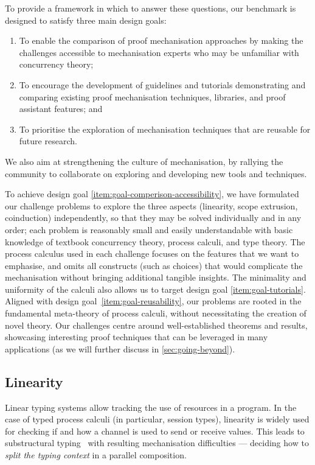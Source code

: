 \documentclass[runningheads]{llncs}
\begin{document}
To provide a framework in which to answer these questions, our benchmark is designed to satisfy three main design goals:
\begin{enumerate}[label=\textbf{(G\arabic*)},leftmargin=10mm]
\item\label{item:goal-comperison-accessibility} To enable the comparison of
  proof mechanisation approaches by making the challenges accessible to
  mechanisation experts who may be unfamiliar with concurrency theory;

\item\label{item:goal-tutorials} To encourage the development of guidelines and
  tutorials demonstrating and comparing existing proof mechanisation
  techniques, libraries, and proof assistant features; and

\item\label{item:goal-reusability} To prioritise the exploration of mechanisation
  techniques that are reusable for future research.
\end{enumerate}
We also aim at strengthening the culture of mechanisation, by rallying the community to collaborate on exploring and developing new tools and techniques.

To achieve design goal \ref{item:goal-comperison-accessibility}, we have
formulated our challenge problems to explore the three aspects
(linearity, scope extrusion, coinduction) independently, so that they
may be solved individually and in any order; each problem is
reasonably small and easily understandable with basic knowledge of
textbook concurrency theory, process calculi, and type theory.  The
process calculus used in each challenge focuses on the features that
we want to emphasise, and omits all constructs (such as choices) that
would complicate the mechanisation without bringing additional
tangible insights.  The minimality and uniformity of the
calculi also allows us to target design goal
\ref{item:goal-tutorials}.
Aligned with design goal~\ref{item:goal-reusability}, our problems are rooted in the fundamental meta-theory of process calculi, without necessitating the creation of novel theory.
Our challenges centre around well-established theorems and results, showcasing interesting proof techniques that can be leveraged in many applications (as we will further discuss in \cref{sec:going-beyond}).

\subsection{Linearity}
Linear typing systems allow  tracking the use of resources in a program. In
the case of typed process calculi (in particular, session types), linearity is
widely used for checking if and how a channel is used to send or receive values.
This leads to substructural typing~\cite[Chapter 1]{Pierce2004-oq} with
resulting mechanisation difficulties --- \eg deciding how to \emph{split the
typing context} in a parallel composition.
\end{document}
